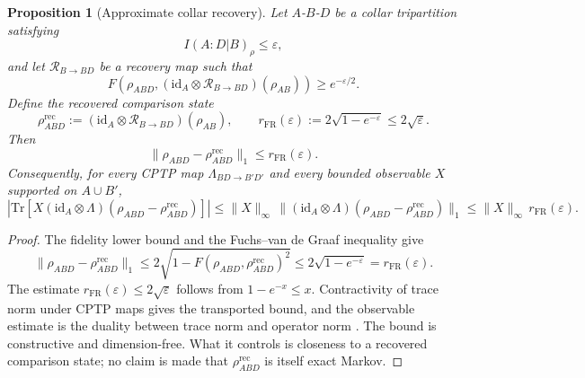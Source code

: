 \documentclass[11pt]{article}
\newtheorem{proposition}[theorem]{Proposition}
\begin{document}
\begin{proposition}[Approximate collar recovery]\label{prop:approxrecover}
Let \(A\)-\(B\)-\(D\) be a collar tripartition satisfying
\[
I(A:D|B)_\rho\le \varepsilon,
\]
and let $\mathcal R_{B\to BD}$ be a recovery map such that
\[
F\!\left(\rho_{ABD},(\mathrm{id}_A\otimes \mathcal R_{B\to BD})(\rho_{AB})\right)\ge e^{-\varepsilon/2}.
\]
Define the recovered comparison state
\[
\rho^{\mathrm{rec}}_{ABD}:=(\mathrm{id}_A\otimes \mathcal R_{B\to BD})(\rho_{AB}),
\qquad
r_{\mathrm{FR}}(\varepsilon):=2\sqrt{1-e^{-\varepsilon}}\le 2\sqrt{\varepsilon}.
\]
Then
\[
\|\rho_{ABD}-\rho^{\mathrm{rec}}_{ABD}\|_1\le r_{\mathrm{FR}}(\varepsilon).
\]
Consequently, for every CPTP map \(\Lambda_{BD\to B'D'}\) and every bounded observable \(X\) supported on \(A\cup B'\),
\[
\left|\mathrm{Tr}\!\left[X(\mathrm{id}_A\otimes \Lambda)(\rho_{ABD}-\rho^{\mathrm{rec}}_{ABD})\right]\right|
\le
\|X\|_\infty\,\|(\mathrm{id}_A\otimes \Lambda)(\rho_{ABD}-\rho^{\mathrm{rec}}_{ABD})\|_1
\le
\|X\|_\infty\,r_{\mathrm{FR}}(\varepsilon).
\]
\end{proposition}

\begin{proof}
The fidelity lower bound and the Fuchs--van de Graaf inequality give
\[
\|\rho_{ABD}-\rho^{\mathrm{rec}}_{ABD}\|_1
\le
2\sqrt{1-F(\rho_{ABD},\rho^{\mathrm{rec}}_{ABD})^2}
\le
2\sqrt{1-e^{-\varepsilon}}
=
r_{\mathrm{FR}}(\varepsilon).
\]
The estimate \(r_{\mathrm{FR}}(\varepsilon)\le 2\sqrt{\varepsilon}\) follows from \(1-e^{-x}\le x\). Contractivity of trace norm under CPTP maps gives the transported bound, and the observable estimate is the duality between trace norm and operator norm \cite{fawziRenner15}. The bound is constructive and dimension-free. What it controls is closeness to a recovered comparison state; no claim is made that \(\rho^{\mathrm{rec}}_{ABD}\) is itself exact Markov.
\end{proof}
\end{document}

